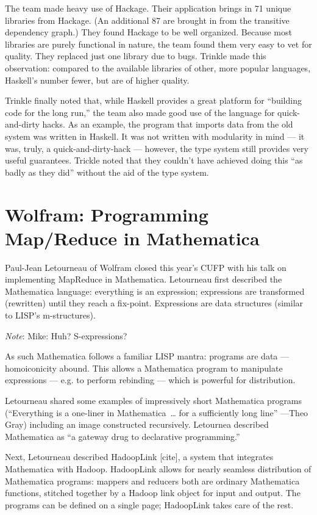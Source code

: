 \documentclass{jfp1}
\newenvironment{ipar}[0]%
 {\begin{list}{}%
 {\setlength{\leftmargin}{1cm}}%
\item[]%
 }
 {\end{list}}
\newcommand\needcite{{\color{red} [cite]}\xspace}
\newcommand{\note}[1]{ \begin{ipar}  {\color{Gray} \textit{Note}: #1} \end{ipar}}
\begin{document}
The team made heavy use of Hackage. Their application brings in 
71 unique libraries from Hackage. (An additional 87 are brought in
from the transitive dependency graph.) They found Hackage to be 
well organized. Because most libraries are purely functional in nature,
the team found them very easy to vet for quality. They replaced just
one library due to bugs. Trinkle made this observation: compared to 
the available libraries of other, more popular languages, Haskell's 
number fewer, but are of higher quality.

Trinkle finally noted that, while Haskell provides a great platform
for ``building code for the long run,'' the team also made good use of
the language for quick-and-dirty hacks. As an example, the program
that imports data from the old system was written in Haskell. It was
not written with modularity in mind --- it was, truly, a
quick-and-dirty-hack --- however, the type system still provides very
useful guarantees. Trickle noted that they couldn't have achieved
doing this ``as badly as they did'' without the aid of the type
system.

\section{Wolfram: Programming Map/Reduce in Mathematica}


Paul-Jean Letourneau of Wolfram closed this year's CUFP with his talk
on implementing MapReduce in Mathematica. Letourneau first described
the Mathematica language: everything is an expression; expressions are
transformed (rewritten) until they reach a fix-point. Expressions are
data structures (similar to LISP's m-structures).  \note{Mike: Huh?
  S-expressions?}  As such Mathematica
follows a familiar LISP mantra: programs are data --- homoiconicity
abound. This allows a Mathematica program to manipulate expressions
--- e.g. to perform rebinding --- which is powerful for distribution.

Letourneau shared some examples of impressively short Mathematica
programs (``Everything is a one-liner in Mathematica~\ldots{} for a sufficiently
long line'' ---Theo Gray) including an image constructed recursively. 
Letournea described Mathematica as ``a gateway drug to declarative
programming.''

Next, Letourneau described HadoopLink\needcite, a system that integrates
Mathematica with Hadoop. HadoopLink allows for nearly seamless 
distribution of Mathematica programs: mappers and reducers both
are ordinary Mathematica functions, stitched together by a Hadoop
link object for input and output. The programs can be defined on a single
page; HadoopLink takes care of the rest.
\end{document}
